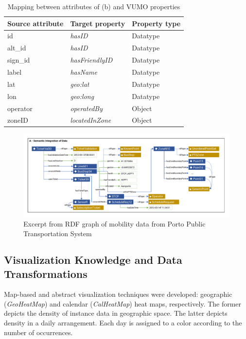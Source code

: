 \documentclass[]{interact}
\theoremstyle{plain}%
\theoremstyle{definition}
\theoremstyle{remark}
\theoremstyle{definition}
\begin{document}
\begin{table}[ht!]
\caption{Mapping between attributes of (b) and VUMO properties}
\label{tab:correspondence}
\centering
\begin{tabular}{lll}
    \hline
    \hline
    Source attribute & Target property & Property type\\
    \hline

	id & \textit{hasID} & Datatype\\
	alt\_id & \textit{hasID} & Datatype\\
	sign\_id & \textit{hasFriendlyID} & Datatype\\
	label & \textit{hasName} & Datatype\\
	lat & \textit{geo:lat} & Datatype\\
	lon & \textit{geo:long} & Datatype\\
	operator & \textit{operatedBy} & Object\\
	zoneID & \textit{locatedInZone} & Object \\
    \hline
    \hline
\end{tabular}
\end{table}

\begin{figure}[!tbp]
\centering
\includegraphics[width=\textwidth]{images/rdf.pdf}
\caption{Excerpt from RDF graph of mobility data from Porto Public Transportation System}
\label{fig:instancedata}
\end{figure}

\subsection{Visualization Knowledge and Data Transformations}

Map-based and abstract visualization techniques were developed: geographic (\textit{GeoHeatMap}) and calendar (\textit{CalHeatMap}) heat maps, respectively. The former depicts the density of instance data in geographic space. The latter depicts density in a daily arrangement. Each day is assigned to a color according to the number of occurrences.
\end{document}

